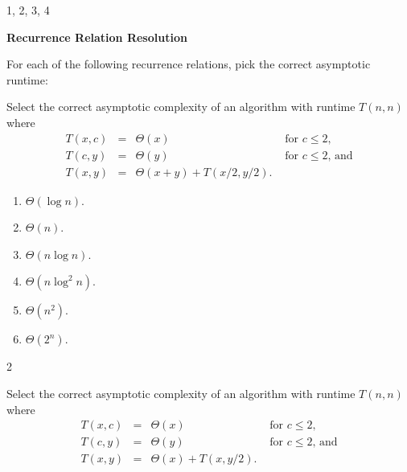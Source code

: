 \documentclass[12pt,twoside]{article}
\begin{document}
\begin{problems}
\begin{problemparts}
        \ifsolution \solution{}
            1, 2, 3, 4
        \fi

    \end{problemparts}

    \problem {} \textbf{Recurrence Relation Resolution}

    For each of the following recurrence relations, pick the correct asymptotic
    runtime:

    \begin{problemparts}

        \problempart {}
        Select the correct asymptotic complexity
        of an algorithm with runtime $T(n, n)$
        where 
        $$
            \begin{array}{rcll}
                T(x, c) & = & \Theta(x)                         & \textrm{ for $c \le 2$},     \\
                T(c, y) & = & \Theta(y)                         & \textrm{ for $c \le 2$, and} \\
                T(x, y) & = & \Theta(x + y) + T(x / 2, y / 2).
            \end{array}
        $$

        \begin{enumerate}
            \item $\Theta(\log n)$.
            \item $\Theta(n)$.
            \item $\Theta(n \log n)$.
            \item $\Theta(n \log^2 n)$.
            \item $\Theta(n^2)$.
            \item $\Theta(2^n)$.
        \end{enumerate}

        \ifsolution \solution{}
            2
        \fi

        \problempart {}
        Select the correct asymptotic complexity
        of an algorithm with runtime $T(n, n)$
        where 
        $$
            \begin{array}{rcll}
                T(x, c) & = & \Theta(x)                 & \textrm{ for $c \le 2$},     \\
                T(c, y) & = & \Theta(y)                 & \textrm{ for $c \le 2$, and} \\
                T(x, y) & = & \Theta(x) + T(x, y / 2).
            \end{array}
        $$


\end{problemparts}
\end{problems}
\end{document}
